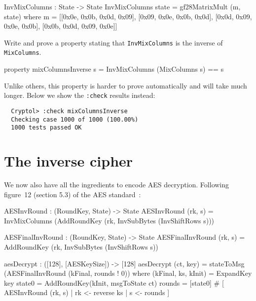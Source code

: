 \begin{code}
  InvMixColumns : State -> State
  InvMixColumns state = gf28MatrixMult (m, state)
    where m = [[0x0e, 0x0b, 0x0d, 0x09],
               [0x09, 0x0e, 0x0b, 0x0d],
               [0x0d, 0x09, 0x0e, 0x0b],
               [0x0b, 0x0d, 0x09, 0x0e]]
\end{code}

\begin{Exercise}\label{ex:aesimc:0}
  Write and prove a property stating that {\tt InvMixColumns} is the
  inverse of {\tt MixColumns}.
\end{Exercise}
\begin{Answer}
\begin{code}
  property mixColumnsInverse s = InvMixColumns (MixColumns s) == s
\end{code}
Unlike others, this property is harder to prove automatically and will
take much longer. Below we show the {\tt :check} results instead:
\begin{Verbatim}
  Cryptol> :check mixColumnsInverse
  Checking case 1000 of 1000 (100.00%) 
  1000 tests passed OK
\end{Verbatim}

\end{Answer}

\section{The inverse cipher}
\label{sec:inverse-cipher}

We now also have all the ingredients to encode AES decryption.
Following figure~12 (section 5.3) of the AES\indAES
standard~\cite{aes}: {\small
\begin{code}
  AESInvRound : (RoundKey, State) -> State
  AESInvRound (rk, s) =
    InvMixColumns (AddRoundKey (rk, InvSubBytes (InvShiftRows s)))

  AESFinalInvRound : (RoundKey, State) -> State
  AESFinalInvRound (rk, s) = AddRoundKey (rk, InvSubBytes (InvShiftRows s))

  aesDecrypt : ([128], [AESKeySize]) -> [128]
  aesDecrypt (ct, key) = stateToMsg (AESFinalInvRound (kFinal, rounds ! 0))
    where
      (kFinal, ks, kInit) = ExpandKey key
      state0 = AddRoundKey(kInit, msgToState ct)
      rounds = [state0] # [ AESInvRound (rk, s) 
                          | rk <- reverse ks
                          | s  <- rounds
                          ]
\end{code}
}

